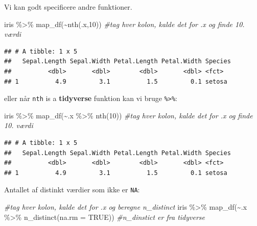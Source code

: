 \documentclass[
]{book}
\newenvironment{Shaded}{\begin{snugshade}}{\end{snugshade}}
\newcommand{\AttributeTok}[1]{\textcolor[rgb]{0.77,0.63,0.00}{#1}}
\newcommand{\CommentTok}[1]{\textcolor[rgb]{0.56,0.35,0.01}{\textit{#1}}}
\newcommand{\ConstantTok}[1]{\textcolor[rgb]{0.00,0.00,0.00}{#1}}
\newcommand{\DecValTok}[1]{\textcolor[rgb]{0.00,0.00,0.81}{#1}}
\newcommand{\FunctionTok}[1]{\textcolor[rgb]{0.00,0.00,0.00}{#1}}
\newcommand{\NormalTok}[1]{#1}
\newcommand{\SpecialCharTok}[1]{\textcolor[rgb]{0.00,0.00,0.00}{#1}}
\begin{document}
Vi kan godt specificere andre funktioner.

\begin{Shaded}
\begin{Highlighting}[]
\NormalTok{iris }\SpecialCharTok{\%\textgreater{}\%}
  \FunctionTok{map\_df}\NormalTok{(}\SpecialCharTok{\textasciitilde{}}\FunctionTok{nth}\NormalTok{(.x,}\DecValTok{10}\NormalTok{)) }\CommentTok{\#tag hver kolon, kalde det for .x og finde 10. værdi}
\end{Highlighting}
\end{Shaded}

\begin{verbatim}
## # A tibble: 1 x 5
##   Sepal.Length Sepal.Width Petal.Length Petal.Width Species
##          <dbl>       <dbl>        <dbl>       <dbl> <fct>  
## 1          4.9         3.1          1.5         0.1 setosa
\end{verbatim}

eller når \texttt{nth} is a \textbf{tidyverse} funktion kan vi bruge \texttt{\%\textgreater{}\%}:

\begin{Shaded}
\begin{Highlighting}[]
\NormalTok{iris }\SpecialCharTok{\%\textgreater{}\%}
  \FunctionTok{map\_df}\NormalTok{(}\SpecialCharTok{\textasciitilde{}}\NormalTok{.x }\SpecialCharTok{\%\textgreater{}\%} \FunctionTok{nth}\NormalTok{(}\DecValTok{10}\NormalTok{)) }\CommentTok{\#tag hver kolon, kalde det for .x og finde 10. værdi}
\end{Highlighting}
\end{Shaded}

\begin{verbatim}
## # A tibble: 1 x 5
##   Sepal.Length Sepal.Width Petal.Length Petal.Width Species
##          <dbl>       <dbl>        <dbl>       <dbl> <fct>  
## 1          4.9         3.1          1.5         0.1 setosa
\end{verbatim}

Antallet af distinkt værdier som ikke er \texttt{NA}:

\begin{Shaded}
\begin{Highlighting}[]
\CommentTok{\#tag hver kolon, kalde det for .x og beregne n\_distinct}
\NormalTok{iris }\SpecialCharTok{\%\textgreater{}\%}
  \FunctionTok{map\_df}\NormalTok{(}\SpecialCharTok{\textasciitilde{}}\NormalTok{.x }\SpecialCharTok{\%\textgreater{}\%} \FunctionTok{n\_distinct}\NormalTok{(}\AttributeTok{na.rm =} \ConstantTok{TRUE}\NormalTok{)) }\CommentTok{\#n\_dinstict er fra tidyverse}
\end{Highlighting}
\end{Shaded}
\end{document}
